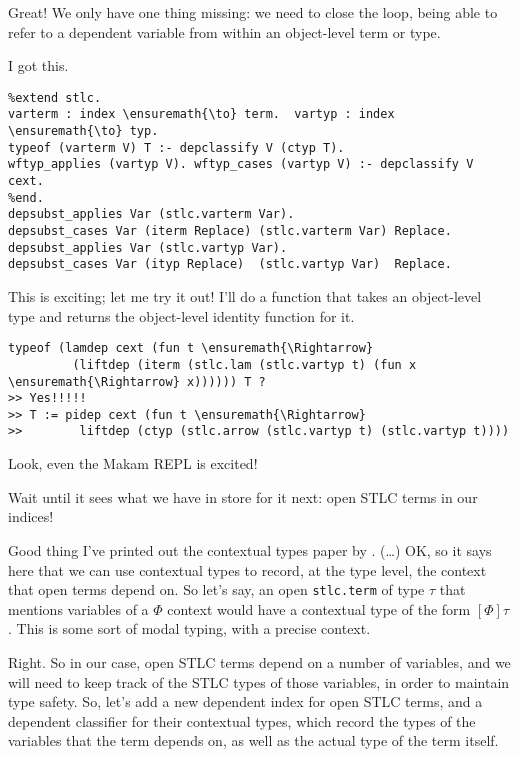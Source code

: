 \heroADVISOR{} Great! We only have one thing missing: we need to close the
loop, being able to refer to a dependent variable from within an
object-level term or type.

\heroSTUDENT{} I got this.

\begin{verbatim}
%extend stlc.
varterm : index \ensuremath{\to} term.  vartyp : index \ensuremath{\to} typ.
typeof (varterm V) T :- depclassify V (ctyp T).
wftyp_applies (vartyp V). wftyp_cases (vartyp V) :- depclassify V cext.
%end.
depsubst_applies Var (stlc.varterm Var).
depsubst_cases Var (iterm Replace) (stlc.varterm Var) Replace.
depsubst_applies Var (stlc.vartyp Var).
depsubst_cases Var (ityp Replace)  (stlc.vartyp Var)  Replace.
\end{verbatim}

\heroADVISOR{} This is exciting; let me try it out! I'll do a function that
takes an object-level type and returns the object-level identity
function for it.

\begin{verbatim}
typeof (lamdep cext (fun t \ensuremath{\Rightarrow}
         (liftdep (iterm (stlc.lam (stlc.vartyp t) (fun x \ensuremath{\Rightarrow} x)))))) T ?
>> Yes!!!!!
>> T := pidep cext (fun t \ensuremath{\Rightarrow}
>>        liftdep (ctyp (stlc.arrow (stlc.vartyp t) (stlc.vartyp t))))
\end{verbatim}

\heroSTUDENT{} Look, even the Makam REPL is excited!

\heroADVISOR{} Wait until it sees what we have in store for it next: open STLC
terms in our indices!

\heroSTUDENT{} Good thing I've printed out the contextual types paper by
\citet{nanevski2008contextual}. (\ldots{}) OK, so it says here that we
can use contextual types to record, at the type level, the context that
open terms depend on. So let's say, an open \texttt{stlc.term} of type
\(\tau\) that mentions variables of a \(\Phi\) context would have a
contextual type of the form \([\Phi] \tau\). This is some sort of modal
typing, with a precise context.

\heroADVISOR{} Right. So in our case, open STLC terms depend on a number of
variables, and we will need to keep track of the STLC types of those
variables, in order to maintain type safety. So, let's add a new
dependent index for open STLC terms, and a dependent classifier for
their contextual types, which record the types of the variables that the
term depends on, as well as the actual type of the term itself.

